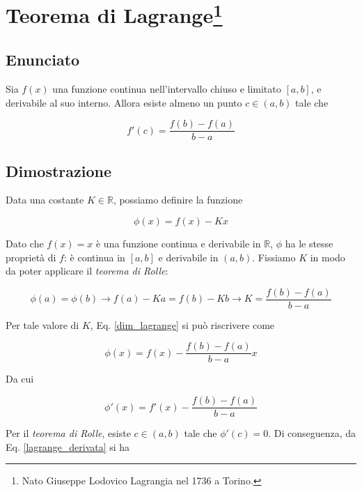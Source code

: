 \documentclass{article}
\begin{document}
\section{Teorema di Lagrange\footnote{Nato Giuseppe Lodovico Lagrangia nel 1736 a Torino.}}

\subsection{Enunciato}

Sia $f(x)$ una funzione continua nell'intervallo chiuso e limitato $[a,b]$, e derivabile al suo interno. Allora esiste almeno un punto $c\in(a,b)$ tale che 

\begin{equation}
    f'(c) = \frac{f(b) - f(a)}{b-a}
\end{equation}

\subsection{Dimostrazione}

Data una costante $K\in\mathbb{R}$, possiamo definire la funzione

\begin{equation}
    \phi(x) = f(x) - Kx
    \label{dim_lagrange}
\end{equation}

Dato che $f(x) = x$ è una funzione continua e derivabile in $\mathbb{R}$, $\phi$ ha le stesse proprietà di $f$: è continua in $[a,b]$ e derivabile in $(a,b)$. Fissiamo $K$ in modo da poter applicare il {\emph{teorema di Rolle}}:

\begin{equation}
    \phi(a) = \phi(b) \rightarrow f(a) - Ka = f(b) - Kb \rightarrow K = \frac{f(b)-f(a)}{b-a}
\end{equation}

Per tale valore di $K$, Eq. \eqref{dim_lagrange} si può riscrivere come

\begin{equation}
    \phi(x) = f(x) -\frac{f(b)-f(a)}{b-a}x
\end{equation}

Da cui

\begin{equation}
    \phi'(x) = f'(x) -\frac{f(b)-f(a)}{b-a}
    \label{lagrange_derivata}
\end{equation}

Per il {\emph{teorema di Rolle}}, esiste $c\in(a,b)$ tale che $\phi'(c) = 0$. Di conseguenza, da Eq. \eqref{lagrange_derivata} si ha 
\end{document}
